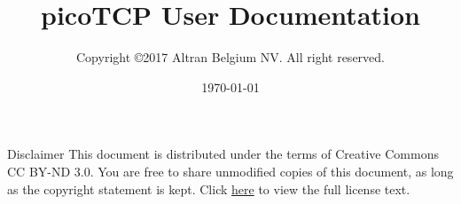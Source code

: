 %






\usepackage{longtable}


\usepackage[compact]{titlesec}

\usepackage{enumitem}

\usepackage{hyperref}
\setcounter{tocdepth}{1}




\title{picoTCP User Documentation}
\author{Copyright \copyright 2017 Altran Belgium NV. All right reserved.}
\maketitle
\date{\today}
\maketitle

\thispagestyle{empty}

Disclaimer
This document is distributed under the terms of Creative Commons CC BY-ND 3.0.
You are free to share unmodified copies of this document, as long as the copyright
statement is kept. Click \href{http://creativecommons.org/licenses/by-nd/3.0/} {here} to view the full license text.


